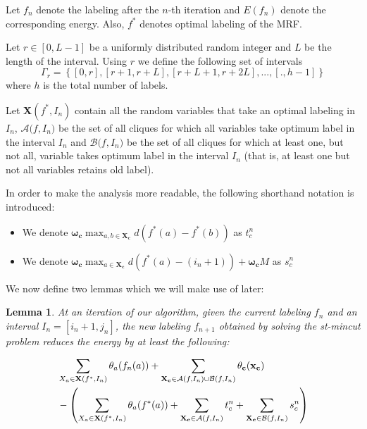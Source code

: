 \documentclass[10pt,letterpaper]{article}
\newtheorem{lemma}{Lemma}
\begin{document}
Let $f_n$ denote the labeling after the $n$-th iteration and $E(f_n)$ denote the corresponding energy. Also, $f^*$ denotes optimal labeling of the MRF.

Let $r \in [0, L-1]$ be a uniformly distributed random integer and $L$ be the length of the interval. Using $r$ we define the following set of intervals
\begin{equation*}
	\Gamma_r = \left\{[0, r], [r + 1, r + L], [r + L + 1, r + 2L], ..., [., h -1]\right\}
\end{equation*}
where $h$ is the total number of labels.

Let \textbf{X}$(f^*, I_{n})$ contain all the random variables that take an optimal labeling in $I_{n}$, $\mathcal{A}\mathit(f, I_n)$ be the set of all cliques for which all variables take optimum label in the interval $I_{n}$ and $\mathcal{B}\mathit(f, I_n)$ be the set of all cliques for which at least one, but not all, variable takes optimum label in the interval $I_{n}$ (that is, at least one but not all variables retains old label).

In order to make the analysis more readable, the following shorthand notation is introduced:

\begin{itemize}
	\item We denote $\mathbf{\omega_c} \max_{a, b \in \mathbf{X_c}} d(f^*(a) - f^*(b))$ as $t_c^n$
	\item We denote $\mathbf{\omega_c} \max_{a \in \mathbf{X_c}} d(f^*(a) - (i_n + 1)) + \mathbf{\omega_c}\mathit{M} $ as $s_c^n$
\end{itemize}

We now define two lemmas which we will make use of later:

\begin{lemma}
At an iteration of our algorithm, given the current labeling $f_n$ and an interval $I_n = [i_n + 1, j_n]$, the new labeling $f_{n+1}$ obtained by solving the st-mincut problem reduces the energy by at least the following:

\begin{equation*}
	\begin{split}
		& \sum_{X_a \in {\bf X}(f^*, I_{n})} \theta_{a}(f_n(a)) + \sum_{{\bf X_c} \in \mathcal{A}\mathit(f, I_n) \cup \mathcal{B}\mathit(f, I_n)} \theta_{\bf c}({\bf x_c}) \\
		&	  - \left( \sum_{X_a \in {\bf X}(f^*, I_{n})} \theta_{a}(f^*(a)) + \sum_{{\bf X_c} \in \mathcal{A}\mathit(f, I_n)} t_c^n 
	 +  \sum_{{\bf X_c} \in \mathcal{B}\mathit(f, I_n)} s_c^n \right) 
	 \end{split}
\end{equation*}
\label{lemma:reductionlowerBound}
\end{lemma}
\end{document}
